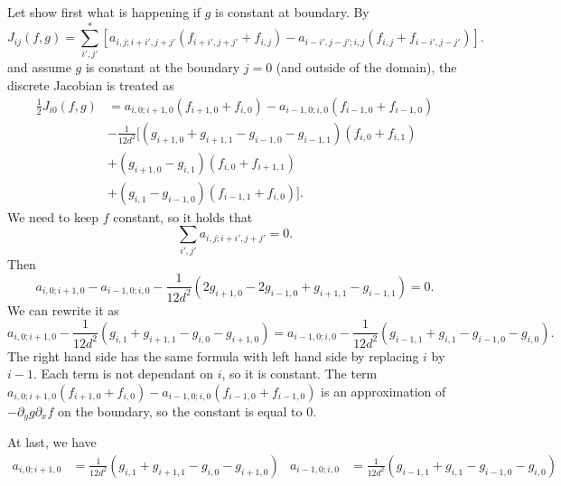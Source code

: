 Let show first what is happening if $g$ is constant at boundary. By
\begin{equation}
    J_{ij}(f,g)=\sum^*_{i',j'}[a_{i,j;i+i',j+j'}(f_{i+i',j+j'}+f_{i,j})-a_{i-i',j-j';i,j}(f_{i,j}+f_{i-i',j-j'})].
\end{equation}
and assume $g$ is constant at the boundary $j=0$ (and outside of the domain), the discrete Jacobian is treated as
\begin{equation}
\begin{aligned}
\frac{1}{2}J_{i0} (f,g) &= a_{i,0;i+1,0}(f_{i+1,0}+f_{i,0})-a_{i-1,0;i,0}(f_{i-1,0}+f_{i-1,0})\\
&-\frac{1}{12d^2}[(g_{i+1,0}+g_{i+1,1}-g_{i-1,0}-g_{i-1,1})(f_{i,0}+f_{i,1})\\
&+(g_{i+1,0}-g_{i,1})(f_{i,0}+f_{i+1,1})\\
&+(g_{i,1}-g_{i-1,0})(f_{i-1,1}+f_{i,0})].
\end{aligned}
\end{equation}
We need to keep $f$ constant, so it holds that $$\sum_{i',j'} a_{i,j;i+i',j+j'}=0.$$ 
Then 
$$a_{i,0;i+1,0}-a_{i-1,0;i,0}-\frac{1}{12d^2}(2g_{i+1,0}-2g_{i-1,0}+g_{i+1,1}-g_{i-1,1})=0.$$
We can rewrite it as 
$$a_{i,0;i+1,0}-\frac{1}{12d^2}(g_{i,1}+g_{i+1,1}-g_{i,0}-g_{i+1,0})=a_{i-1,0;i,0}-\frac{1}{12d^2}(g_{i-1,1}+g_{i,1}-g_{i-1,0}-g_{i,0}).$$
The right hand side has the same formula with left hand side by replacing $i$ by $i-1$. Each term is not dependant on $i$, so it is constant. The term $a_{i,0;i+1,0}(f_{i+1,0}+f_{i,0})-a_{i-1,0;i,0}(f_{i-1,0}+f_{i-1,0})$ is an approximation of $-\partial_y g \partial_x f$ on the boundary, so the constant is equal to $0$.

At last, we have
\begin{align}
	a_{i,0;i+1,0} & = \frac{1}{12d^2}(g_{i,1}+g_{i+1,1}-g_{i,0}-g_{i+1,0}) &
	a_{i-1,0;i,0} & = \frac{1}{12d^2}(g_{i-1,1}+g_{i,1}-g_{i-1,0}-g_{i,0})
\end{align}


